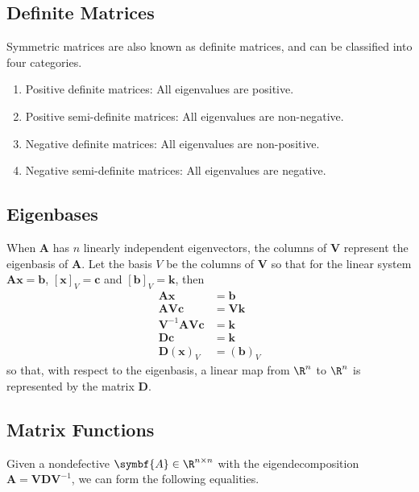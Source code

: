 \documentclass{article}
\begin{document}
\subsection{Definite Matrices}
Symmetric matrices are also known as definite matrices, and can be
classified into four categories.
\begin{enumerate}
    \item Positive definite matrices: All eigenvalues are positive.
    \item Positive semi-definite matrices: All eigenvalues are
          non-negative.
    \item Negative definite matrices: All eigenvalues are non-positive.
    \item Negative semi-definite matrices: All eigenvalues are negative.
\end{enumerate}
\subsection{Eigenbases}
When \(\symbf{A}\) has \(n\) linearly independent eigenvectors, the
columns of \(\symbf{V}\) represent the eigenbasis of \(\symbf{A}\).
Let the basis \(V\) be the columns of \(\symbf{V}\) so that for the
linear system \(\symbf{A}\symbf{x} = \symbf{b}\), \(\left[ \symbf{x}
\right]_V = \symbf{c}\) and \(\left[ \symbf{b} \right]_V = \symbf{k}\),
then
\begin{align*}
    \symbf{A} \symbf{x}                          & = \symbf{b}                  \\
    \symbf{A} \symbf{V} \symbf{c}                & = \symbf{V} \symbf{k}        \\
    \symbf{V}^{-1} \symbf{A} \symbf{V} \symbf{c} & = \symbf{k}                  \\
    \symbf{D} \symbf{c}                          & = \symbf{k}                  \\
    \symbf{D} \left( \symbf{x} \right)_V         & = \left( \symbf{b} \right)_V
\end{align*}
so that, with respect to the eigenbasis, a linear map from \(\R^n\) to \(\R^n\) is represented by the matrix \(\symbf{D}\).
\subsection{Matrix Functions}
Given a nondefective \(\symbf{A} \in \R^{n \times n}\) with the
eigendecomposition \(\symbf{A} = \symbf{V} \symbf{D} \symbf{V}^{-1}\),
we can form the following equalities.
\end{document}
